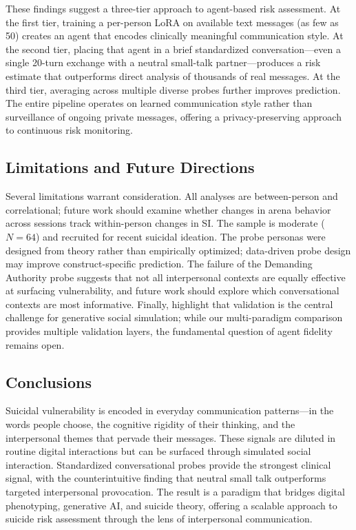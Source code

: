 \documentclass[review,12pt,authoryear]{elsarticle}
\begin{document}
These findings suggest a three-tier approach to agent-based risk assessment. At the first tier, training a per-person LoRA on available text messages (as few as 50) creates an agent that encodes clinically meaningful communication style. At the second tier, placing that agent in a brief standardized conversation---even a single 20-turn exchange with a neutral small-talk partner---produces a risk estimate that outperforms direct analysis of thousands of real messages. At the third tier, averaging across multiple diverse probes further improves prediction. The entire pipeline operates on learned communication style rather than surveillance of ongoing private messages, offering a privacy-preserving approach to continuous risk monitoring.

\subsection{Limitations and Future Directions}

Several limitations warrant consideration. All analyses are between-person and correlational; future work should examine whether changes in arena behavior across sessions track within-person changes in SI. The sample is moderate ($N = 64$) and recruited for recent suicidal ideation. The probe personas were designed from theory rather than empirically optimized; data-driven probe design may improve construct-specific prediction. The failure of the Demanding Authority probe suggests that not all interpersonal contexts are equally effective at surfacing vulnerability, and future work should explore which conversational contexts are most informative. Finally, \citet{tornberg2025validation} highlight that validation is the central challenge for generative social simulation; while our multi-paradigm comparison provides multiple validation layers, the fundamental question of agent fidelity remains open.

\subsection{Conclusions}

Suicidal vulnerability is encoded in everyday communication patterns---in the words people choose, the cognitive rigidity of their thinking, and the interpersonal themes that pervade their messages. These signals are diluted in routine digital interactions but can be surfaced through simulated social interaction. Standardized conversational probes provide the strongest clinical signal, with the counterintuitive finding that neutral small talk outperforms targeted interpersonal provocation. The result is a paradigm that bridges digital phenotyping, generative AI, and suicide theory, offering a scalable approach to suicide risk assessment through the lens of interpersonal communication.
\end{document}
